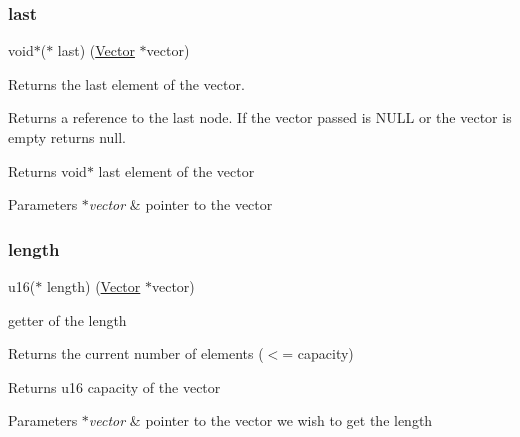 \subsubsection{\texorpdfstring{last}{last}}
{\footnotesize\ttfamily void$\ast$($\ast$ last) (\hyperlink{structadt__vector__s}{Vector} $\ast$vector)}



Returns the last element of the vector. 

Returns a reference to the last node. If the vector passed is N\+U\+LL or the vector is empty returns null.

\begin{DoxyReturn}{Returns}
void$\ast$ last element of the vector 
\end{DoxyReturn}

\begin{DoxyParams}{Parameters}
{\em $\ast$vector} & pointer to the vector \\
\hline
\end{DoxyParams}
\mbox{\label{structadt__vector__ops__s_ad93f13eb8650e3fe7ffd61b3ddae81ac}} 
\subsubsection{\texorpdfstring{length}{length}}
{\footnotesize\ttfamily u16($\ast$ length) (\hyperlink{structadt__vector__s}{Vector} $\ast$vector)}



getter of the length 

Returns the current number of elements ($<$= capacity)

\begin{DoxyReturn}{Returns}
u16 capacity of the vector 
\end{DoxyReturn}

\begin{DoxyParams}{Parameters}
{\em $\ast$vector} & pointer to the vector we wish to get the length \\
\hline
\end{DoxyParams}
\mbox{\label{structadt__vector__ops__s_a6d71713def271d762ccccbbe22249525}} 
